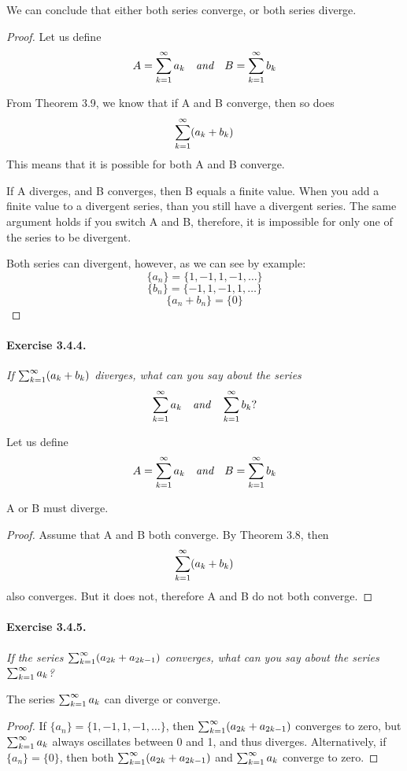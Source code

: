 \documentclass[11pt]{article}
\newcommand{\set}[1]{\{#1\}}
\begin{document}
We can conclude that either both series converge, or both series diverge. 
\begin{proof}
Let us define $$A = \sum_{k=1}^{\infty} a_k \quad \textit{and} \quad B = \sum_{k=1}^{\infty} b_k$$

From Theorem 3.9, we know that if A and B converge, then so does $$\sum_{k=1}^{\infty} (a_k+b_k)$$ This means that it is possible for both A and B converge. 

If A diverges, and B converges, then B equals a finite value. When you add a finite value to a divergent series, than you still have a divergent series. The same argument holds if you switch A and B, therefore, it is impossible for only one of the series to be divergent. 

Both series can divergent, however, as we can see by example:
$$\set{a_n} = \set{1,  -1, 1, -1, \dots}$$
$$\set{b_n} = \set{-1, 1, -1, 1, \dots}$$
$$\set{a_n + b_n} = \set{0}$$
\end{proof}

\paragraph{Exercise 3.4.4.} \textit{If $\sum_{k=1}^{\infty} (a_k+b_k)$ diverges, what can you say
about the series} \[ \sum_{k=1}^{\infty} a_k \quad \textit{and} \quad \sum_{k=1}^{\infty} b_k ? \]

Let us define $$A = \sum_{k=1}^{\infty} a_k \quad \textit{and} \quad B = \sum_{k=1}^{\infty} b_k$$

A or B must diverge. 

\begin{proof}
Assume that A and B both converge. By Theorem 3.8, then $$\sum_{k=1}^{\infty} (a_k+b_k)$$ also converges. But it does not, therefore A and B do not both converge. 
\end{proof}

\paragraph{Exercise 3.4.5.} \textit{If the series $\sum_{k=1}^{\infty} (a_{2k}+a_{2k-1})$ converges, what can you say about the series $\sum_{k=1}^{\infty} a_k$? \newline}

The series $\sum_{k=1}^{\infty} a_k$ can diverge or converge. 

\begin{proof}

If $\set{a_n} = \set{1, -1, 1, -1, \dots}$, then $\sum_{k=1}^{\infty} (a_{2k}+a_{2k-1})$ converges to zero, but $\sum_{k=1}^{\infty} a_k$ always oscillates between 0 and 1, and thus diverges.
Alternatively, if $\set{a_n} = \set{0}$, then both $\sum_{k=1}^{\infty} (a_{2k}+a_{2k-1})$ and $\sum_{k=1}^{\infty} a_k$ converge to zero.

\end{proof}
\end{document}
